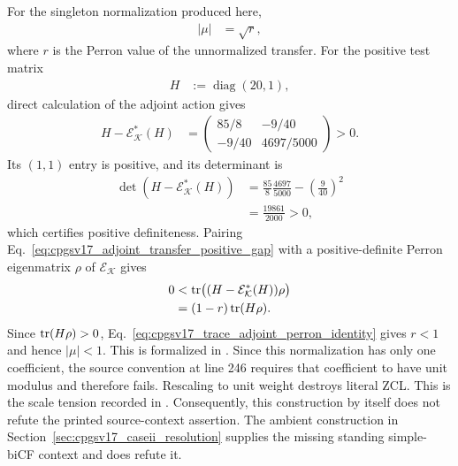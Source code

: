 \documentclass{article}
\begin{document}
For the singleton normalization produced here,
\begin{align}
    |\mu|
        &= \sqrt r,
    \label{eq:cpgsv17_noncartesian_weight_perron_value}
\end{align}
where $r$ is the Perron value of the unnormalized transfer. For the positive
test matrix
\begin{align}
    H
        &:= \operatorname{diag}(20,1),
    \label{eq:cpgsv17_positive_test_matrix}
\end{align}
direct calculation of the adjoint action gives
\begin{align}
    H-\mathcal E_{\mathcal K}^*(H)
        &=
        \begin{pmatrix}
            85/8&-9/40\\
            -9/40&4697/5000
        \end{pmatrix}
        >0.
    \label{eq:cpgsv17_adjoint_transfer_positive_gap}
\end{align}
Its $(1,1)$ entry is positive, and its determinant is
\begin{align}
    \det(H-\mathcal E_{\mathcal K}^*(H))
        &= \frac{85}{8}\frac{4697}{5000}
           -\left(\frac9{40}\right)^2
    \label{eq:cpgsv17_positive_gap_determinant_expansion}\\
        &= \frac{19861}{2000}
         >0,
    \label{eq:cpgsv17_positive_gap_determinant}
\end{align}
which certifies positive definiteness. Pairing
Eq.~\ref{eq:cpgsv17_adjoint_transfer_positive_gap} with a positive-definite
Perron eigenmatrix $\rho$ of $\mathcal E_{\mathcal K}$ gives
\begin{align}
    0
        &<
        \operatorname{tr}\bigl(        (H-\mathcal E_{\mathcal K}^*(H))\rho
        \bigr)
    \label{eq:cpgsv17_positive_gap_pairing}\\
        &=
        (1-r)\operatorname{tr}(H\rho).
    \label{eq:cpgsv17_trace_adjoint_perron_identity}
\end{align}
Since $\operatorname{tr}(H\rho)>0$, Eq.~\ref{eq:cpgsv17_trace_adjoint_perron_identity}
gives $r<1$ and hence $|\mu|<1$. This is formalized in
. Since this normalization has only one
coefficient, the source convention at line 246 requires that coefficient to
have unit modulus and therefore fails. Rescaling to unit weight destroys
literal ZCL. This is the scale tension recorded in
.
Consequently, this construction by itself does not refute the printed
source-context assertion. The ambient construction in
Section~\ref{sec:cpgsv17_caseii_resolution} supplies the missing standing
simple-biCF context and does refute it.
\end{document}
